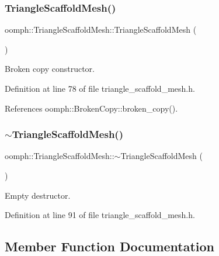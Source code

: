 \subsubsection{\texorpdfstring{Triangle\+Scaffold\+Mesh()}{TriangleScaffoldMesh()}\hspace{0.1cm}{\footnotesize\ttfamily [4/4]}}
{\footnotesize\ttfamily oomph\+::\+Triangle\+Scaffold\+Mesh\+::\+Triangle\+Scaffold\+Mesh (\begin{DoxyParamCaption}\item[{const \hyperlink{classoomph_1_1TriangleScaffoldMesh}{Triangle\+Scaffold\+Mesh} \&}]{ }\end{DoxyParamCaption})\hspace{0.3cm}{\ttfamily [inline]}}



Broken copy constructor. 



Definition at line 78 of file triangle\+\_\+scaffold\+\_\+mesh.\+h.



References oomph\+::\+Broken\+Copy\+::broken\+\_\+copy().

\mbox{\label{classoomph_1_1TriangleScaffoldMesh_ac53d43d072f72576c1e1d15c5eddb806}} 
\subsubsection{\texorpdfstring{$\sim$\+Triangle\+Scaffold\+Mesh()}{~TriangleScaffoldMesh()}}
{\footnotesize\ttfamily oomph\+::\+Triangle\+Scaffold\+Mesh\+::$\sim$\+Triangle\+Scaffold\+Mesh (\begin{DoxyParamCaption}{ }\end{DoxyParamCaption})\hspace{0.3cm}{\ttfamily [inline]}}



Empty destructor. 



Definition at line 91 of file triangle\+\_\+scaffold\+\_\+mesh.\+h.



\subsection{Member Function Documentation}
\mbox{\label{classoomph_1_1TriangleScaffoldMesh_a56af4394a96d57f9d0aa1974a4ead8b2}} 
